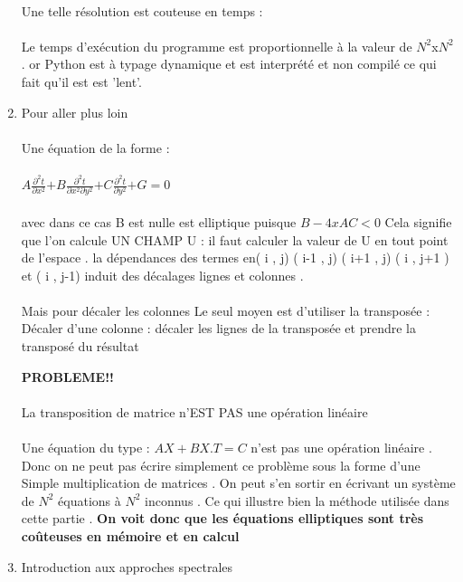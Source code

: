 \documentclass{article}
\begin{document}
\begin{enumerate}
   
   
   
   
   \paragraph{}
    Une telle résolution est couteuse en temps : 
    \paragraph{}
   Le temps d'exécution du programme est proportionnelle à la valeur de $N^2$x$N^2$ . or Python est à typage dynamique et est interprété et non compilé ce  qui fait qu'il est  est 'lent'. 
   \item{Pour aller plus loin  } 
   \paragraph{}
   Une équation de la forme  : 
   \paragraph{}
   $A $$\frac{\partial^2 t}{\partial x^2}$$ + B	$$\frac{\partial^2 t}{\partial x^2 \partial y^2}$$ + C 	$$\frac{\partial^2 t}{\partial y^2}$$ +G = 0 $ 
  \paragraph{}
   avec dans ce cas B est nulle est elliptique puisque $ B - 4 xAC < 0 $ 
   Cela signifie que l’on calcule UN CHAMP U : il faut calculer la valeur de U en tout
   point de l’espace . 
   la dépendances des termes en( i , j) ( i-1 , j) ( i+1 , j) ( i , j+1 ) et ( i , j-1) 
   induit des décalages lignes et colonnes . 
   \paragraph{}
   Mais pour décaler les colonnes Le seul moyen est d’utiliser la transposée : 
   Décaler d’une colonne : décaler les lignes de la transposée et prendre la
   transposé du résultat
  
   \textbf{PROBLEME!! }
   \paragraph{}  
   La transposition de matrice n’EST PAS une opération linéaire
   \paragraph{}
   Une équation du type : $A X + B X.T = C $ n’est pas une opération linéaire .
   Donc on ne peut pas  écrire simplement ce problème sous la forme d’une Simple multiplication de matrices . 
   On peut s’en sortir en écrivant un système de $N^2$ équations à $N^2$ inconnus . 
   Ce qui illustre bien la méthode utilisée dans cette partie . 
   \textbf{On voit donc que les équations elliptiques sont très coûteuses en mémoire et
   en calcul} 
  \item { Introduction aux approches spectrales } 

\end{enumerate}
\end{document}
